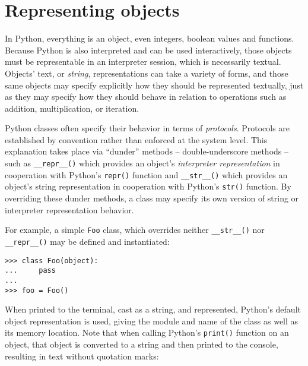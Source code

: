 \section{Representing objects}
\label{sec:representing-objects}

In Python, everything is an object, even integers, boolean values and
functions. Because Python is also interpreted and can be used interactively,
those objects must be representable in an interpreter session, which is
necessarily textual. Objects' text, or \emph{string}, representations can take
a variety of forms, and those same objects may specify explicitly how they
should be represented textually, just as they may specify how they should
behave in relation to operations such as addition, multiplication, or
iteration.

Python classes often specify their behavior in terms of \emph{protocols}.
Protocols are established by convention rather than enforced at the system
level. This explanation takes place via \enquote{dunder} methods --
double-underscore methods -- such as \texttt{\_\_repr\_\_()} which provides an
object's \emph{interpreter representation} in cooperation with Python's
\texttt{repr()} function and \texttt{\_\_str\_\_()} which provides an object's
string representation in cooperation with Python's \texttt{str()}
function. By overriding these dunder methods, a class may specify its own
version of string or interpreter representation behavior.

For example, a simple \texttt{Foo} class, which overrides neither
\texttt{\_\_str\_\_()} nor \texttt{\_\_repr\_\_()} may be defined and
instantiated:

\begin{comment}
<abjad>
class Foo(object):
    pass

foo = Foo()
</abjad>
\end{comment}

\begin{abjadbookoutput}
\begin{singlespacing}
\vspace{-0.5\baselineskip}
\begin{lstlisting}
>>> class Foo(object):
...     pass
...
>>> foo = Foo()
\end{lstlisting}
\end{singlespacing}
\end{abjadbookoutput}

\noindent When printed to the terminal, cast as a string, and represented,
Python's default object representation is used, giving the module and name of
the class as well as its memory location. Note that when calling Python's
\texttt{print()} function on an object, that object is converted to a string
and then printed to the console, resulting in text without quotation marks:

